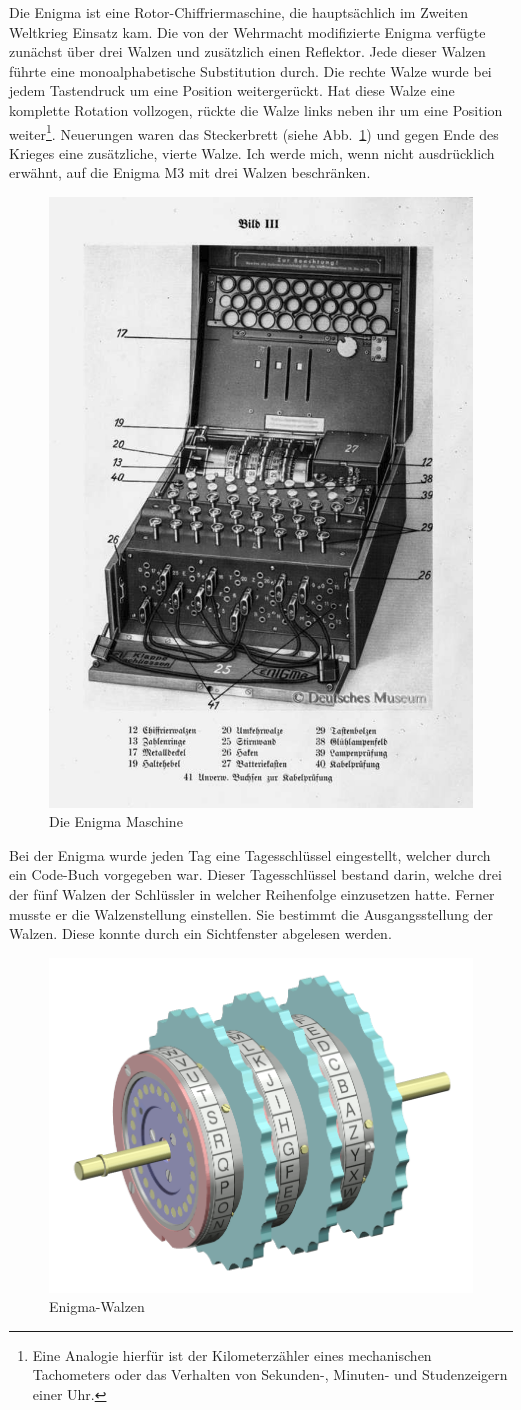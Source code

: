 \documentclass[ngerman, a4paper, footsepline, headsepline, numbers=noenddot]{scrreport}
\newcommand{\figref}[1]{(siehe Abb.~\ref{#1})}
\begin{document}
	Die Enigma ist eine Rotor-Chiffriermaschine, die hauptsächlich im Zweiten Weltkrieg Einsatz kam. Die von der Wehrmacht modifizierte Enigma verfügte zunächst über drei Walzen und zusätzlich einen Reflektor. Jede dieser Walzen führte eine monoalphabetische Substitution durch. Die rechte Walze wurde bei jedem Tastendruck um eine Position weitergerückt. Hat diese Walze eine komplette Rotation vollzogen, rückte die Walze links neben ihr um eine Position weiter\footnote{Eine Analogie hierfür ist der Kilometerzähler eines mechanischen Tachometers oder das Verhalten von Sekunden-, Minuten- und Studenzeigern einer Uhr.}. Neuerungen waren das Steckerbrett \figref{fig:enigma_complete} und gegen Ende des Krieges eine zusätzliche, vierte Walze. Ich werde mich, wenn nicht ausdrücklich erwähnt, auf die Enigma M3 mit drei Walzen beschränken.
	\nopagebreak
	\begin{figure}[htbp]
		\centering
		\includegraphics[width=.5\linewidth]{Enigma-komplett.png}
		\caption{Die Enigma Maschine}
		\label{fig:enigma_complete}
	\end{figure}
	
	\newpage
	
	 Bei der Enigma wurde jeden Tag  eine Tagesschlüssel eingestellt, welcher durch ein Code-Buch vorgegeben war. Dieser Tagesschlüssel bestand darin, welche drei der fünf Walzen der Schlüssler in welcher Reihenfolge einzusetzen hatte. Ferner musste er die Walzenstellung einstellen. Sie bestimmt die Ausgangsstellung der Walzen. Diese konnte durch ein Sichtfenster abgelesen werden.
	
	\begin{figure}[htbp]
		\centering
		\includegraphics[width=.4\linewidth]{Enigma-rotor-set.png}
		\caption{Enigma-Walzen}
		\label{fig:enigma_rotors}
	\end{figure}
	
\end{document}
